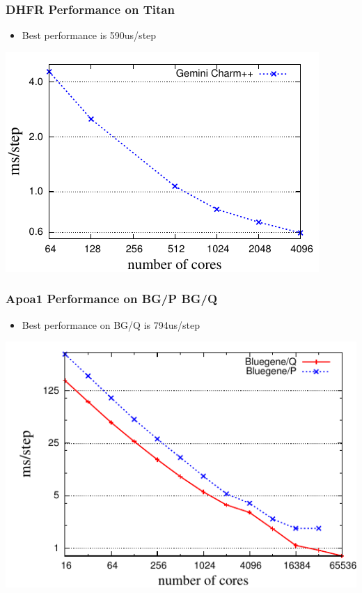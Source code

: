 \begin{frame}[t]
\frametitle{DHFR Performance on Titan}
  \begin{itemize}
  \item Best performance is 590us/step
  \end{itemize}
  \begin{center} \includegraphics[width=.8\textwidth]{figures/jac-titan-pme4.pdf} \end{center}
\end{frame}

\begin{frame}[t]
\frametitle{Apoa1 Performance on BG/P BG/Q}
  \begin{itemize}
  \item Best performance on BG/Q is 794us/step
  \end{itemize}
  \begin{center} \includegraphics[width=.8\textwidth]{figures/apoa1-pme4-PQ.pdf} \end{center}
\end{frame}



